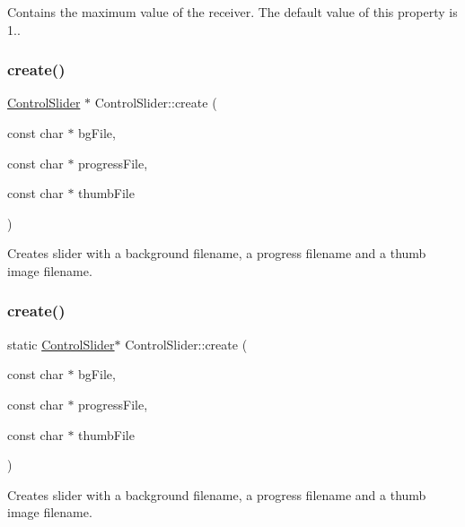 Contains the maximum value of the receiver. The default value of this property is 1.. \mbox{\label{classControlSlider_a39748567b2f0b5b2ee63c866242eda68}} 
\subsubsection{\texorpdfstring{create()}{create()}\hspace{0.1cm}{\footnotesize\ttfamily [1/8]}}
{\footnotesize\ttfamily \hyperlink{classControlSlider}{Control\+Slider} $\ast$ Control\+Slider\+::create (\begin{DoxyParamCaption}\item[{const char $\ast$}]{bg\+File,  }\item[{const char $\ast$}]{progress\+File,  }\item[{const char $\ast$}]{thumb\+File }\end{DoxyParamCaption})\hspace{0.3cm}{\ttfamily [static]}}

Creates slider with a background filename, a progress filename and a thumb image filename. \mbox{\label{classControlSlider_a86059da200464edbbf77b7bf62493e24}} 
\subsubsection{\texorpdfstring{create()}{create()}\hspace{0.1cm}{\footnotesize\ttfamily [2/8]}}
{\footnotesize\ttfamily static \hyperlink{classControlSlider}{Control\+Slider}$\ast$ Control\+Slider\+::create (\begin{DoxyParamCaption}\item[{const char $\ast$}]{bg\+File,  }\item[{const char $\ast$}]{progress\+File,  }\item[{const char $\ast$}]{thumb\+File }\end{DoxyParamCaption})\hspace{0.3cm}{\ttfamily [static]}}

Creates slider with a background filename, a progress filename and a thumb image filename. \mbox{\label{classControlSlider_a8d3cb487abdd4b0f8d5fed8e127bf7c1}} 
